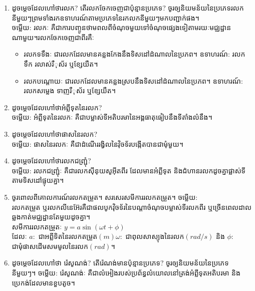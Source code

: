 \documentclass{officialexam}
\begin{document}
\begin{enumerate}[m]
		\begin{multicols}{2}
			\begin{itemize}
				\item វគ្គទី១ៈ វគ្គបណ្ណែន និងបន្ទុះ
				\item វគ្គទី២ៈ វគ្គស្រូបបញ្ចូល និងបញ្ចេញ។
			\end{itemize}
		\end{multicols}
		\item ដូចម្តេចដែលហៅថារលក? តើរលកចែកចេញជាប៉ុន្មានប្រភេទ? ចូរឲ្យនិយមន័យនៃប្រភេទរលកនីមួយៗព្រមទាំងរកឧទាហរណ៍តាមប្រភេទនៃរកលកនីមួយៗមកបញ្ជាក់ផង។\\
		{\color{red}\sffamily ចម្លើយ}: រលកៈ គឺជាការបញ្ចូនថាមពលពីចំណុចមួយទៅចំណុចផ្សេងទៀតាមរយៈមជ្ឈដ្ឋានណាមួយ។រលកចែកចេញជាពីរគឺៈ
		\begin{itemize}
			\item រលកទទឹងៈ ជារលកដែលមានគន្លងកែងនឹងទិសដៅដំណាលនៃប្រភព។ {\color{red}\sffamily ឧទាហរណ៍}: រលកទឹក រលាស់រឺុស័រ ឬខ្សែយឺត។
			\item រលកបណ្តោយៈ ជារលកដែលមានគន្លងស្របនឹងទិសដៅដំណាលនៃប្រភព។ {\color{red}\sffamily ឧទាហរណ៍}: រលកសម្លេង ទាញរឺុស័រ ឬខ្សែយឺត។
		\end{itemize}
		\item ដូចម្តេចដែលហៅថាអំព្លីទុតនៃរលក?\\
		{\color{red}\sffamily ចម្លើយ}: អំព្លីទុតនៃរលកៈ គឺជាបម្លាស់ទីអតិបរមានៃអង្គធាតុធៀបនឹងទីតាំងលំនឹង។
		\item ដូចម្តេចដែលហៅថាផាសនៃរលក?\\
		{\color{red}\sffamily ចម្លើយ}: ផាសនៃរលកៈ គឺជាដំណើររង្វិលនៃវុិចទ័របង្កើតបានជាមុំមួយ។
		\item ដូចម្តេចដែលហៅថារលកជញ្ជ្រុំ?\\
		{\color{red}\sffamily ចម្លើយ}: រលកជញ្ជ្រុំៈ គឺជារលកសុីនុយសូអុីតពីរ ដែលមានអំព្លីទុត និងជំហានរលកដូចគ្នាផ្លាស់ទីតាមទិសដៅផ្ទុយគ្នា។
		\item ចូរពោលពីគោលការណ៍រលកតម្រួត។ សរសេរសមីការរលកតម្រួត។
		{\color{red}\sffamily ចម្លើយ}:\\ រលកតម្រួត ឬរលកលីនេអ៊ែរគឺជាផលបូកវុិចទ័រនៃបណ្តាចំណុចបម្លាស់ទីរលកពីរ ឬច្រើនពេលដាលឆ្លងកាត់មជ្ឈដ្ឋានតែមួយដូចគ្នា។\\
		សមីការរលកតម្រួតៈ $y=a\sin\left(\omega t+\phi\right)$\\
		ដែលៈ $a:$ ជាអព្លីទិតនៃរលកតម្រួត$\left(m\right)$\quad $\omega:$ ជាពុលសាស្យុងនៃរលក$\left(rad/s\right)$ និង $\phi:$ ជាមុំផាសដើមសមមូលនៃរលក$\left(rad\right)$។
		\item ដូចម្តេចដែលហៅថា រ៉េសូណង់? តើរ៉េណង់មានប៉ុន្មានប្រភេទ? ចូរឲ្យនិយមន័យនៃប្រភេទនីមួយៗ។
		{\color{red}\sffamily ចម្លើយ}: រ៉េសូណង់ៈ គឺជាលំអៀងរបស់ប្រព័ន្ធលំយោលនៅត្រង់អំព្លីទុតអតិបរមា និងប្រេកង់ដែលមានខួបតូច។

\end{enumerate}
\end{document}
